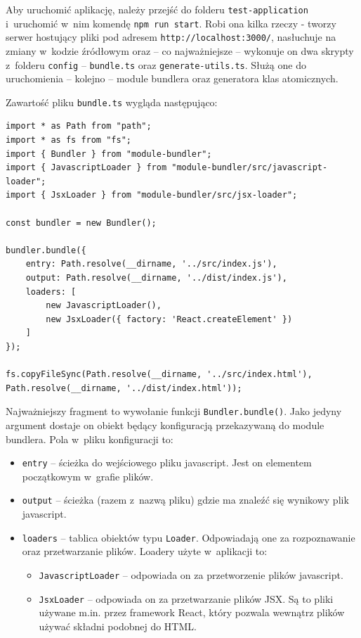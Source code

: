 \documentclass{SGGW-thesis}
\begin{document}
Aby uruchomić aplikację, należy przejść do folderu \verb|test-application| i~uruchomić w~nim komendę \verb|npm run start|. Robi ona kilka rzeczy - tworzy serwer hostujący pliki pod adresem \verb|http://localhost:3000/|, nasłuchuje na zmiany w~kodzie źródłowym oraz -- co najważniejsze -- wykonuje on dwa skrypty z~folderu \verb|config| -- \verb|bundle.ts| oraz \verb|generate-utils.ts|. Służą one do uruchomienia -- kolejno -- module bundlera oraz generatora klas atomicznych.

Zawartość pliku \verb|bundle.ts| wygląda następująco:

\begin{verbatim}
import * as Path from "path";
import * as fs from "fs";
import { Bundler } from "module-bundler";
import { JavascriptLoader } from "module-bundler/src/javascript-loader";
import { JsxLoader } from "module-bundler/src/jsx-loader";

const bundler = new Bundler();

bundler.bundle({
	entry: Path.resolve(__dirname, '../src/index.js'),
	output: Path.resolve(__dirname, '../dist/index.js'),
	loaders: [
		new JavascriptLoader(),
		new JsxLoader({ factory: 'React.createElement' })
	]
});

fs.copyFileSync(Path.resolve(__dirname, '../src/index.html'), Path.resolve(__dirname, '../dist/index.html'));
\end{verbatim}

Najważniejszy fragment to wywołanie funkcji \verb|Bundler.bundle()|. Jako jedyny argument dostaje on obiekt będący konfiguracją przekazywaną do module bundlera. Pola w~pliku konfiguracji to:
\begin{itemize}
    \item \verb|entry| -- ścieżka do wejściowego pliku javascript. Jest on elementem początkowym w~grafie plików.
    \item \verb|output| -- ścieżka (razem z~nazwą pliku) gdzie ma znaleźć się wynikowy plik javascript.
    \item \verb|loaders| -- tablica obiektów typu \verb|Loader|. Odpowiadają one za rozpoznawanie oraz przetwarzanie plików. Loadery użyte w~aplikacji to:
    \begin{itemize}
        \item \verb|JavascriptLoader| -- odpowiada on za przetworzenie plików javascript.
        \item \verb|JsxLoader| -- odpowiada on za przetwarzanie plików JSX. Są to pliki używane m.in. przez framework React, który pozwala wewnątrz plików używać składni podobnej do HTML.
    \end{itemize}
\end{itemize}
\end{document}
